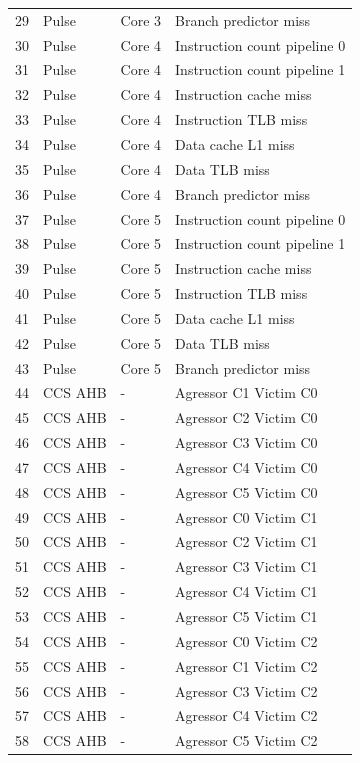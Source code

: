 \begin{center}
\begin{longtable}{|l|l|l|l|}
29 & Pulse & Core 3 &  Branch predictor miss \\
30 & Pulse & Core 4 &  Instruction count pipeline 0 \\
31 & Pulse & Core 4 &  Instruction count pipeline 1 \\
32 & Pulse & Core 4 &  Instruction cache miss \\
33 & Pulse & Core 4 &  Instruction TLB miss \\
34 & Pulse & Core 4 &  Data cache L1 miss \\
35 & Pulse & Core 4 &  Data TLB miss \\
36 & Pulse & Core 4 &  Branch predictor miss \\
37 & Pulse & Core 5 &  Instruction count pipeline 0 \\
38 & Pulse & Core 5 &  Instruction count pipeline 1 \\
39 & Pulse & Core 5 &  Instruction cache miss \\
40 & Pulse & Core 5 &  Instruction TLB miss \\
41 & Pulse & Core 5 &  Data cache L1 miss \\
42 & Pulse & Core 5 &  Data TLB miss \\
43 & Pulse & Core 5 &  Branch predictor miss \\
44 & CCS AHB &  -  &  Agressor C1 Victim C0\\
45 & CCS AHB &  -  &  Agressor C2 Victim C0\\
46 & CCS AHB &  -  &  Agressor C3 Victim C0\\
47 & CCS AHB &  -  &  Agressor C4 Victim C0\\
48 & CCS AHB &  -  &  Agressor C5 Victim C0\\
49 & CCS AHB &  -  &  Agressor C0 Victim C1\\
50 & CCS AHB &  -  &  Agressor C2 Victim C1\\
51 & CCS AHB &  -  &  Agressor C3 Victim C1\\
52 & CCS AHB &  -  &  Agressor C4 Victim C1\\
53 & CCS AHB &  -  &  Agressor C5 Victim C1\\
54 & CCS AHB &  -  &  Agressor C0 Victim C2\\
55 & CCS AHB &  -  &  Agressor C1 Victim C2\\
56 & CCS AHB &  -  &  Agressor C3 Victim C2\\
57 & CCS AHB &  -  &  Agressor C4 Victim C2\\
58 & CCS AHB &  -  &  Agressor C5 Victim C2\\

\end{longtable}
\end{center}
